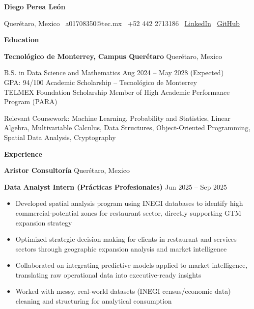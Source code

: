 \documentclass[11pt]{article}
\begin{document}
\begin{center}
    \textbf{Diego Perea León}\\
    \hrulefill
\end{center}

\begin{center}
    Querétaro, Mexico \textbullet \ a01708350@tec.mx \textbullet \ +52 442 2713186 \textbullet \ \href{https://www.linkedin.com/in/diego-perea-le%C3%B3n-bbba81335/}{LinkedIn} \textbullet \ \href{https://github.com/Perea094}{GitHub}
\end{center}

\vspace{0.5pt}

\begin{center}
    \textbf{Education}
\end{center}
\textbf{Tecnológico de Monterrey, Campus Querétaro} \hfill Querétaro, Mexico

B.S. in Data Science and Mathematics \hfill Aug 2024 – May 2028 (Expected)\\
GPA: 94/100 \hfill Academic Scholarship – Tecnológico de Monterrey\\
TELMEX Foundation Scholarship \hfill Member of High Academic Performance Program (PARA)

Relevant Coursework: Machine Learning, Probability and Statistics, Linear Algebra, Multivariable Calculus, Data Structures, Object-Oriented Programming, Spatial Data Analysis, Cryptography

\vspace{12pt}

\begin{center}
    \textbf{Experience}
\end{center}
\textbf{Aristor Consultoría} \hfill Querétaro, Mexico

\textbf{Data Analyst Intern (Prácticas Profesionales)} \hfill Jun 2025 – Sep 2025
\begin{itemize}[noitemsep, topsep=0pt, partopsep=0pt, parsep=0pt]
    \item Developed spatial analysis program using INEGI databases to identify high commercial-potential zones for restaurant sector, directly supporting GTM expansion strategy
    \item Optimized strategic decision-making for clients in restaurant and services sectors through geographic expansion analysis and market intelligence
    \item Collaborated on integrating predictive models applied to market intelligence, translating raw operational data into executive-ready insights
    \item Worked with messy, real-world datasets (INEGI census/economic data) cleaning and structuring for analytical consumption
\end{itemize}
\end{document}
